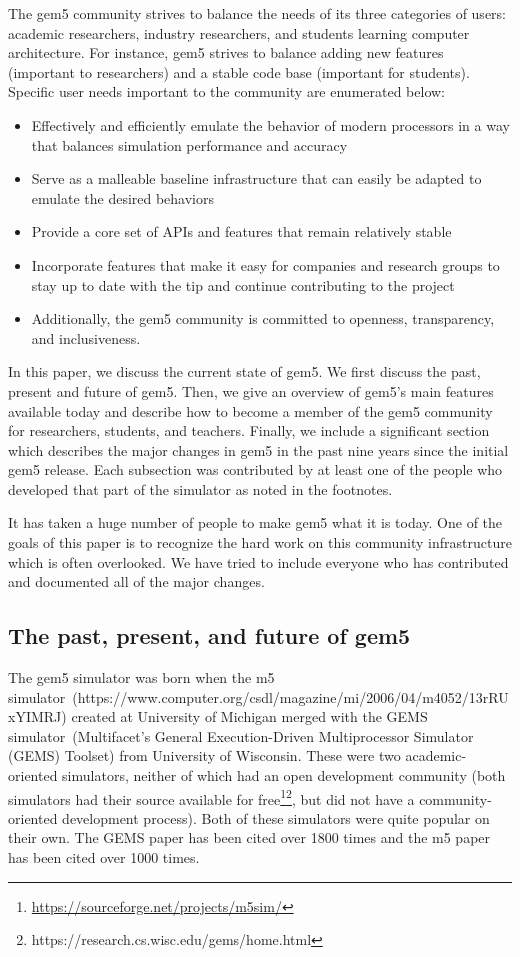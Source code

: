 The gem5 community strives to balance the needs of its three categories of users: academic researchers, industry researchers, and students learning computer architecture.
For instance, gem5 strives to balance adding new features (important to researchers) and a stable code base (important for students).
Specific user needs important to the community are enumerated below:
\begin{itemize}
    \item Effectively and efficiently emulate the behavior of modern processors in a way that balances simulation performance and accuracy
    \item Serve as a malleable baseline infrastructure that can easily be adapted to emulate the desired behaviors
    \item Provide a core set of APIs and features that remain relatively stable
    \item Incorporate features that make it easy for companies and research groups to stay up to date with the tip and continue contributing to the project
    \item Additionally, the gem5 community is committed to openness, transparency, and inclusiveness.
\end{itemize}

In this paper, we discuss the current state of gem5.
We first discuss the past, present and future of gem5.
Then, we give an overview of gem5's main features available today and describe how to become a member of the gem5 community for researchers, students, and teachers.
Finally, we include a significant section which describes the major changes in gem5 in the past nine years since the initial gem5 release.
Each subsection was contributed by at least one of the people who developed that part of the simulator as noted in the footnotes.

It has taken a huge number of people to make gem5 what it is today.
One of the goals of this paper is to recognize the hard work on this community infrastructure which is often overlooked.
We have tried to include everyone who has contributed and documented all of the major changes.

\subsection{The past, present, and future of gem5}

The gem5 simulator was born when the m5 simulator~\cite{}(https://www.computer.org/csdl/magazine/mi/2006/04/m4052/13rRUxYIMRJ) created at University of Michigan merged with the GEMS simulator~\cite{}(Multifacet's General Execution-Driven Multiprocessor Simulator (GEMS) Toolset) from University of Wisconsin.
These were two academic-oriented simulators, neither of which had an open development community (both simulators had their source available for free\footnote{\url{https://sourceforge.net/projects/m5sim/}}\footnote{https://research.cs.wisc.edu/gems/home.html}, but did not have a community-oriented development process).
Both of these simulators were quite popular on their own.
The GEMS paper has been cited over 1800 times and the m5 paper has been cited over 1000 times.

